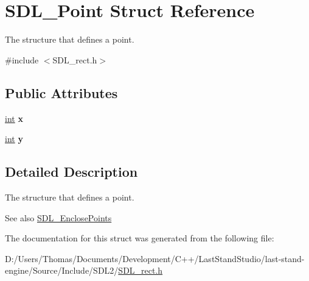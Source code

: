 \hypertarget{structSDL__Point}{}\section{S\+D\+L\+\_\+\+Point Struct Reference}
\label{structSDL__Point}


The structure that defines a point.  




{\ttfamily \#include $<$S\+D\+L\+\_\+rect.\+h$>$}

\subsection*{Public Attributes}
\begin{DoxyCompactItemize}
\item 
\hypertarget{structSDL__Point_a2ee987d59888024771c8d83aec43056c}{}\hyperlink{SDL__thread_8h_a6a64f9be4433e4de6e2f2f548cf3c08e}{int} {\bfseries x}\label{structSDL__Point_a2ee987d59888024771c8d83aec43056c}

\item 
\hypertarget{structSDL__Point_aaa68aefa869f6bdf46367a70bd9414b0}{}\hyperlink{SDL__thread_8h_a6a64f9be4433e4de6e2f2f548cf3c08e}{int} {\bfseries y}\label{structSDL__Point_aaa68aefa869f6bdf46367a70bd9414b0}

\end{DoxyCompactItemize}


\subsection{Detailed Description}
The structure that defines a point. 

\begin{DoxySeeAlso}{See also}
\hyperlink{SDL__rect_8h_afcbb58dbba760b9e6fdb4b5d1ece015c}{S\+D\+L\+\_\+\+Enclose\+Points} 
\end{DoxySeeAlso}


The documentation for this struct was generated from the following file\+:\begin{DoxyCompactItemize}
\item 
D\+:/\+Users/\+Thomas/\+Documents/\+Development/\+C++/\+Last\+Stand\+Studio/last-\/stand-\/engine/\+Source/\+Include/\+S\+D\+L2/\hyperlink{SDL__rect_8h}{S\+D\+L\+\_\+rect.\+h}\end{DoxyCompactItemize}
